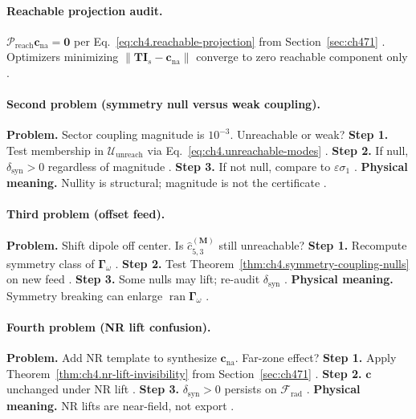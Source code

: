\paragraph{Reachable projection audit.}
\(\mathcal{P}_{\mathrm{reach}}\mathbf{c}_{\mathrm{na}}=\mathbf{0}\) per Eq.~\eqref{eq:ch4.reachable-projection} from Section~\ref{sec:ch471}
\cite{harrington2001,stratton1941,devaney2004}. Optimizers minimizing \(\|\mathbf{T}\mathbf{I}_{s}-\mathbf{c}_{\mathrm{na}}\|\) converge to zero reachable component only
\cite{hansen1988,jackson1999}.

\paragraph{Second problem (symmetry null versus weak coupling).}
\textbf{Problem.} Sector coupling magnitude is \(10^{-3}\). Unreachable or weak?
\textbf{Step 1.} Test membership in \(\mathcal{U}_{\mathrm{unreach}}\) via Eq.~\eqref{eq:ch4.unreachable-modes} \cite{harrington2001,stratton1941}.
\textbf{Step 2.} If null, \(\delta_{\mathrm{syn}}>0\) regardless of magnitude \cite{devaney2004,hansen1988}.
\textbf{Step 3.} If not null, compare to \(\varepsilon\sigma_{1}\) \cite{jackson1999,harrington2001}.
\textbf{Physical meaning.} Nullity is structural; magnitude is not the certificate \cite{stratton1941,hansen1988}.

\paragraph{Third problem (offset feed).}
\textbf{Problem.} Shift dipole off center. Is \(\widehat{c}_{5,3}^{(\mathbf{M})}\) still unreachable?
\textbf{Step 1.} Recompute symmetry class of \(\boldsymbol{\Gamma}_\omega\) \cite{hansen1988,harrington2001}.
\textbf{Step 2.} Test Theorem~\ref{thm:ch4.symmetry-coupling-nulls} on new feed \cite{stratton1941,devaney2004}.
\textbf{Step 3.} Some nulls may lift; re-audit \(\delta_{\mathrm{syn}}\) \cite{jackson1999,hansen1988}.
\textbf{Physical meaning.} Symmetry breaking can enlarge \(\operatorname{ran}\boldsymbol{\Gamma}_\omega\) \cite{harrington2001,stratton1941}.

\paragraph{Fourth problem (NR lift confusion).}
\textbf{Problem.} Add NR template to synthesize \(\mathbf{c}_{\mathrm{na}}\). Far-zone effect?
\textbf{Step 1.} Apply Theorem~\ref{thm:ch4.nr-lift-invisibility} from Section~\ref{sec:ch471} \cite{stratton1941,harrington2001}.
\textbf{Step 2.} \(\mathbf{c}\) unchanged under NR lift \cite{devaney2004,hansen1988}.
\textbf{Step 3.} \(\delta_{\mathrm{syn}}>0\) persists on \(\mathcal{F}_{\mathrm{rad}}\) \cite{jackson1999,harrington2001}.
\textbf{Physical meaning.} NR lifts are near-field, not export \cite{stratton1941,devaney2004}.

